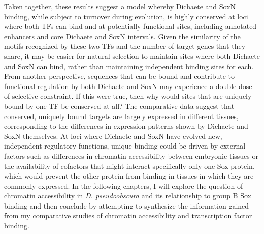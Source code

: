 Taken together, these results suggest a model whereby Dichaete and SoxN binding, while subject to turnover during evolution, is highly conserved at loci where both TFs can bind and at potentially functional sites, including annotated enhancers and core Dichaete and SoxN intervals. Given the similarity of the motifs recognized by these two TFs and the number of target genes that they share, it may be easier for natural selection to maintain sites where both Dichaete and SoxN can bind, rather than maintaining independent binding sites for each. From another perspective, sequences that can be bound and contribute to functional regulation by both Dichaete and SoxN may experience a double dose of selective constraint. If this were true, then why would sites that are uniquely bound by one TF be conserved at all? The comparative data suggest that conserved, uniquely bound targets are largely expressed in different tissues, corresponding to the differences in expression patterns shown by Dichaete and SoxN themselves. At loci where Dichaete and SoxN have evolved new, independent regulatory functions, unique binding could be driven by external factors such as differences in chromatin accessibility between embryonic tissues or the availability of cofactors that might interact specifically only one Sox protein, which would prevent the other protein from binding in tissues in which they are commonly expressed. In the following chapters, I will explore the question of chromatin accessibility in \emph{D. pseudoobscura} and its relationship to group B Sox binding and then conclude by attempting to synthesize the information gained from my comparative studies of chromatin accessibility and transcription factor binding.  


